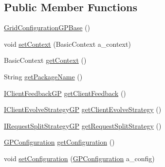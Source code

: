 \subsection*{Public Member Functions}
\begin{DoxyCompactItemize}
\item 
\hyperlink{classorg_1_1jgap_1_1distr_1_1grid_1_1gp_1_1_grid_configuration_g_p_base_a74b2206a20c0bf230fcc87156a5bdfb7}{Grid\-Configuration\-G\-P\-Base} ()
\item 
void \hyperlink{classorg_1_1jgap_1_1distr_1_1grid_1_1gp_1_1_grid_configuration_g_p_base_ac792df106b6622d526e5befe4fd01606}{set\-Context} (Basic\-Context a\-\_\-context)
\item 
Basic\-Context \hyperlink{classorg_1_1jgap_1_1distr_1_1grid_1_1gp_1_1_grid_configuration_g_p_base_a00b0c0a6956168cb4b57367c0e83d210}{get\-Context} ()
\item 
String \hyperlink{classorg_1_1jgap_1_1distr_1_1grid_1_1gp_1_1_grid_configuration_g_p_base_a1dd91980caa58f434017130c85bda0e4}{get\-Package\-Name} ()
\item 
\hyperlink{interfaceorg_1_1jgap_1_1distr_1_1grid_1_1gp_1_1_i_client_feedback_g_p}{I\-Client\-Feedback\-G\-P} \hyperlink{classorg_1_1jgap_1_1distr_1_1grid_1_1gp_1_1_grid_configuration_g_p_base_a4ddcc9fa93c4161a36e67ab678c94287}{get\-Client\-Feedback} ()
\item 
\hyperlink{interfaceorg_1_1jgap_1_1distr_1_1grid_1_1gp_1_1_i_client_evolve_strategy_g_p}{I\-Client\-Evolve\-Strategy\-G\-P} \hyperlink{classorg_1_1jgap_1_1distr_1_1grid_1_1gp_1_1_grid_configuration_g_p_base_afd8a257f7ed7c9427550109113cb8a75}{get\-Client\-Evolve\-Strategy} ()
\item 
\hyperlink{interfaceorg_1_1jgap_1_1distr_1_1grid_1_1gp_1_1_i_request_split_strategy_g_p}{I\-Request\-Split\-Strategy\-G\-P} \hyperlink{classorg_1_1jgap_1_1distr_1_1grid_1_1gp_1_1_grid_configuration_g_p_base_a184e218897c50b4975d271ad65dc7c88}{get\-Request\-Split\-Strategy} ()
\item 
\hyperlink{classorg_1_1jgap_1_1gp_1_1impl_1_1_g_p_configuration}{G\-P\-Configuration} \hyperlink{classorg_1_1jgap_1_1distr_1_1grid_1_1gp_1_1_grid_configuration_g_p_base_a2eab35061eab5c2414743caf554aecea}{get\-Configuration} ()
\item 
void \hyperlink{classorg_1_1jgap_1_1distr_1_1grid_1_1gp_1_1_grid_configuration_g_p_base_a44edbc6a5afb971d1b296d9902466d6b}{set\-Configuration} (\hyperlink{classorg_1_1jgap_1_1gp_1_1impl_1_1_g_p_configuration}{G\-P\-Configuration} a\-\_\-config)
\item 

\end{DoxyCompactItemize}
